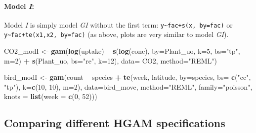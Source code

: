 \documentclass[12pt]{article}
\newenvironment{Shaded}{\begin{snugshade}}{\end{snugshade}}
\newcommand{\KeywordTok}[1]{\textcolor[rgb]{0.13,0.29,0.53}{\textbf{#1}}}
\newcommand{\DataTypeTok}[1]{\textcolor[rgb]{0.13,0.29,0.53}{#1}}
\newcommand{\DecValTok}[1]{\textcolor[rgb]{0.00,0.00,0.81}{#1}}
\newcommand{\StringTok}[1]{\textcolor[rgb]{0.31,0.60,0.02}{#1}}
\newcommand{\OperatorTok}[1]{\textcolor[rgb]{0.81,0.36,0.00}{\textbf{#1}}}
\newcommand{\NormalTok}[1]{#1}
\let\oldparagraph\paragraph
\renewcommand{\paragraph}[1]{\oldparagraph{#1}\mbox{}}
\begin{document}
\paragraph{\texorpdfstring{Model \emph{I}:}{Model I:}}\label{model-i}

Model \emph{I} is simply model \emph{GI} without the first term:
\texttt{y\textasciitilde{}fac+s(x,\ by=fac)} or
\texttt{y\textasciitilde{}fac+te(x1,x2,\ by=fac)} (as above, plots are
very similar to model \emph{GI}).

\begin{Shaded}
\begin{Highlighting}[]
\NormalTok{CO2_modI <-}\StringTok{ }\KeywordTok{gam}\NormalTok{(}\KeywordTok{log}\NormalTok{(uptake) }\OperatorTok{~}\StringTok{ }\KeywordTok{s}\NormalTok{(}\KeywordTok{log}\NormalTok{(conc), }\DataTypeTok{by=}\NormalTok{Plant_uo, }\DataTypeTok{k=}\DecValTok{5}\NormalTok{, }\DataTypeTok{bs=}\StringTok{"tp"}\NormalTok{, }\DataTypeTok{m=}\DecValTok{2}\NormalTok{) }\OperatorTok{+}
\StringTok{                              }\KeywordTok{s}\NormalTok{(Plant_uo, }\DataTypeTok{bs=}\StringTok{"re"}\NormalTok{, }\DataTypeTok{k=}\DecValTok{12}\NormalTok{),}
                \DataTypeTok{data=}\NormalTok{ CO2, }\DataTypeTok{method=}\StringTok{"REML"}\NormalTok{)}


\NormalTok{bird_modI <-}\StringTok{ }\KeywordTok{gam}\NormalTok{(count }\OperatorTok{~}\StringTok{ }\NormalTok{species }\OperatorTok{+}\StringTok{ }
\StringTok{                   }\KeywordTok{te}\NormalTok{(week, latitude, }\DataTypeTok{by=}\NormalTok{species, }\DataTypeTok{bs=} \KeywordTok{c}\NormalTok{(}\StringTok{"cc"}\NormalTok{, }\StringTok{"tp"}\NormalTok{), }
                      \DataTypeTok{k=}\KeywordTok{c}\NormalTok{(}\DecValTok{10}\NormalTok{, }\DecValTok{10}\NormalTok{), }\DataTypeTok{m=}\DecValTok{2}\NormalTok{),}
                 \DataTypeTok{data=}\NormalTok{bird_move, }\DataTypeTok{method=}\StringTok{"REML"}\NormalTok{, }\DataTypeTok{family=}\StringTok{"poisson"}\NormalTok{,}
                 \DataTypeTok{knots =} \KeywordTok{list}\NormalTok{(}\DataTypeTok{week =} \KeywordTok{c}\NormalTok{(}\DecValTok{0}\NormalTok{, }\DecValTok{52}\NormalTok{)))}
\end{Highlighting}
\end{Shaded}

\subsection{Comparing different HGAM
specifications}\label{comparing-different-hgam-specifications}
\end{document}
